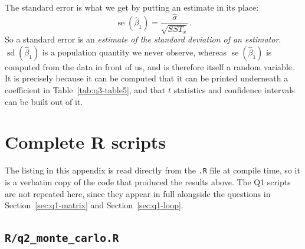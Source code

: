 \documentclass[11pt]{article}
\newcommand{\code}[1]{\texttt{#1}}
\begin{document}
The standard error is what we get by putting an estimate in its place:
\[
\operatorname{se}(\hat\beta_1) = \frac{\hat\sigma}{\sqrt{SST_x}} .
\]
So a standard error is an \emph{estimate of the standard deviation of an
estimator}. $\operatorname{sd}(\hat\beta_1)$ is a
population quantity we never observe, whereas $\operatorname{se}(\hat\beta_1)$
is computed from the data in front of us, and is therefore itself a random
variable. It is precisely because it can be computed that it can be printed
underneath a coefficient in Table~\ref{tab:q3-table5}, and that $t$ statistics
and confidence intervals can be built out of it.

\appendix
\section{Complete R scripts}
\label{app:code}

The listing in this appendix is read directly from the \code{.R} file at compile
time, so it is a verbatim copy of the code that produced the results above. The
Q1 scripts are not repeated here, since they appear in full alongside the
questions in Section~\ref{sec:q1-matrix} and Section~\ref{sec:q1-loop}.

\subsection{\texorpdfstring{\code{R/q2\_monte\_carlo.R}}{R/q2\_monte\_carlo.R}}

\end{document}
